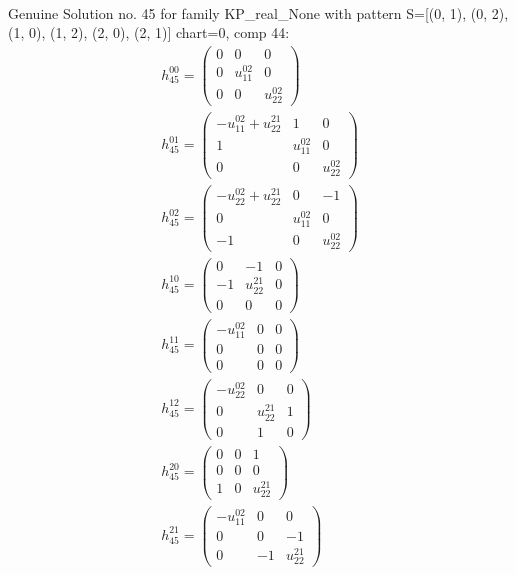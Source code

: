 \documentclass[a4paper, 11pt, twoside, onecolumn]{article}
\begin{document}
\begin{landscape}
\begin{gather*}
\end{gather*} 
Genuine Solution no. 45 for family KP_real_None with pattern S=[(0, 1), (0, 2), (1, 0), (1, 2), (2, 0), (2, 1)] chart=0, comp 44: 
\begin{gather*} 
	 h_{45}^{00}=\begin{pmatrix}0 & 0 & 0\\0 & u^{02}_{11} & 0\\0 & 0 & u^{02}_{22}\end{pmatrix}\\ 
	 h_{45}^{01}=\begin{pmatrix}- u^{02}_{11} + u^{21}_{22} & 1 & 0\\1 & u^{02}_{11} & 0\\0 & 0 & u^{02}_{22}\end{pmatrix}\\ 
	 h_{45}^{02}=\begin{pmatrix}- u^{02}_{22} + u^{21}_{22} & 0 & -1\\0 & u^{02}_{11} & 0\\-1 & 0 & u^{02}_{22}\end{pmatrix}\\ 
	 h_{45}^{10}=\begin{pmatrix}0 & -1 & 0\\-1 & u^{21}_{22} & 0\\0 & 0 & 0\end{pmatrix}\\ 
	 h_{45}^{11}=\begin{pmatrix}- u^{02}_{11} & 0 & 0\\0 & 0 & 0\\0 & 0 & 0\end{pmatrix}\\ 
	 h_{45}^{12}=\begin{pmatrix}- u^{02}_{22} & 0 & 0\\0 & u^{21}_{22} & 1\\0 & 1 & 0\end{pmatrix}\\ 
	 h_{45}^{20}=\begin{pmatrix}0 & 0 & 1\\0 & 0 & 0\\1 & 0 & u^{21}_{22}\end{pmatrix}\\ 
	 h_{45}^{21}=\begin{pmatrix}- u^{02}_{11} & 0 & 0\\0 & 0 & -1\\0 & -1 & u^{21}_{22}\end{pmatrix}\\ 

\end{gather*}
\end{landscape}
\end{document}
